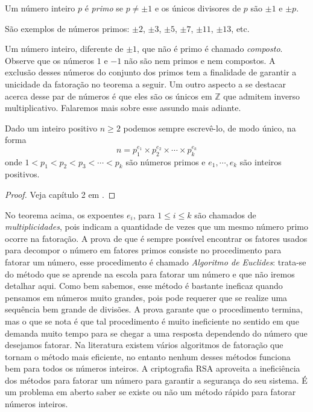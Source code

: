 \begin{Df}
Um n\'umero inteiro $p$ \'e \textit{primo} se $p\neq \pm 1$ e os \'unicos divisores de $p$ s\~ao $\pm 1$ e $\pm p$. 
\end{Df} 

S\~ao exemplos de n\'umeros primos: $\pm 2$, $\pm 3$, $\pm 5$, $\pm 7$, $\pm 11$, $\pm 13$, etc.

Um n\'umero inteiro, diferente de $\pm 1$, que n\~ao \'e primo \'e chamado \textit{composto}. Observe que os n\'umeros $1$ e $-1$ n\~ao s\~ao nem primos e nem compostos. A exclus\~ao desses n\'umeros do conjunto dos primos tem a finalidade de garantir a unicidade da fatora\c{c}\~ao no teorema a seguir. Um outro aspecto a se destacar acerca desse par de n\'umeros \'e que eles s\~ao os \'unicos em $\mathbb{Z}$ que admitem inverso multiplicativo. Falaremos mais sobre esse assundo mais adiante.

\begin{Th}
\label{fat.unica} 
Dado um inteiro positivo $n\geq 2$ podemos sempre escrev\^e-lo, de modo \'unico, na forma
$$n=p_{1}^{e_1}\times p_{2}^{e_2}\times\cdots\times p_{k}^{e_k}$$
onde $1<p_1<p_2<p_3<\cdots<p_k$ s\~ao n\'umeros primos e $e_1, \cdots, e_k$ s\~ao inteiros positivos.
\end{Th}
\begin{proof}
	Veja cap\'{i}tulo 2 em \cite{cou:2014}.
\end{proof}

No teorema acima, os expoentes $e_i$, para $1\leq i\leq k$ s\~ao chamados de \textit{multiplicidades}, pois indicam a quantidade de vezes que um mesmo n\'umero primo ocorre na fatora\c{c}\~ao. A prova de que \'e sempre poss\'ivel encontrar os fatores usados para decompor o n\'umero em fatores primos consiste no procedimento para fatorar um n\'umero, esse procedimento \'e chamado \textit{Algoritmo de Euclides}: trata-se do m\'etodo que se aprende na escola para fatorar
um n\'umero e que n\~ao iremos detalhar aqui. Como bem sabemos, esse m\'etodo \'e bastante ineficaz quando pensamos em n\'umeros muito grandes, pois pode requerer que se realize uma sequ\^encia bem grande de divis\~oes. A prova garante que o procedimento termina, mas o que se nota \'e que tal procedimento \'e muito ineficiente no sentido em que demanda muito tempo para se chegar a uma resposta dependendo do n\'umero que desejamos fatorar. Na literatura existem v\'arios algoritmos de fatora\c{c}\~ao que tornam o m\'etodo mais eficiente, no entanto nenhum desses m\'etodos funciona bem para todos os n\'umeros inteiros. A criptografia RSA aproveita a inefici\^encia dos m\'etodos para fatorar um n\'umero para garantir a seguran\c{c}a do seu sistema. \'E um problema em aberto saber se existe ou n\~ao um m\'etodo r\'apido para fatorar n\'umeros inteiros.  

